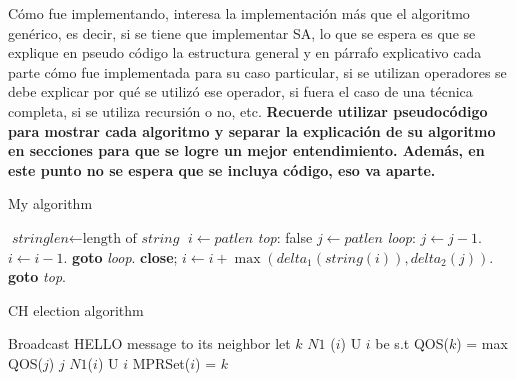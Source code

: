 Cómo fue implementando, interesa la implementación más que el algoritmo
genérico, es decir, si se tiene que implementar SA, lo que se espera
es que se explique en pseudo código la estructura general y en párrafo
explicativo cada parte cómo fue implementada para su caso particular,
si se utilizan operadores se debe explicar por qué se utilizó ese
operador, si fuera el caso de una técnica completa, si se utiliza
recursión o no, etc. \textbf{Recuerde utilizar pseudocódigo para mostrar
cada algoritmo y separar la explicación de su algoritmo en secciones
para que se logre un mejor entendimiento. Además, en este punto no
se espera que se incluya código, eso va aparte.}

\begin{algorithm}
	\caption{My algorithm}\label{euclid}
	\begin{algorithmic}[1]
		\State $\textit{stringlen} \gets \text{length of }\textit{string}$
		\State $i \gets \textit{patlen}$
		\BState \emph{top}:
		 \Return false
		\EndIf
		\State $j \gets \textit{patlen}$
		\BState \emph{loop}:
		\State $j \gets j-1$.
		\State $i \gets i-1$.
		\State \textbf{goto} \emph{loop}.
		\State \textbf{close};
		\EndIf
		\State $i \gets i+\max(\textit{delta}_1(\textit{string}(i)),\textit{delta}_2(j))$.
		\State \textbf{goto} \emph{top}.
		\EndProcedure
	\end{algorithmic}
\end{algorithm}

\begin{algorithm}
	\caption{CH election algorithm}
	\label{CHalgorithm}
	\begin{algorithmic}[1]
		\State Broadcast HELLO message to its neighbor
		\State let $k$  $N1$ ($i$) U {$i$} be s.t
		\State QOS($k$) = max {QOS($j$) \textbar $j$  $N1$($i$)  U $i$}
		\State MPRSet($i$) = $k$
		\EndFor
		\EndProcedure
	\end{algorithmic}
\end{algorithm}